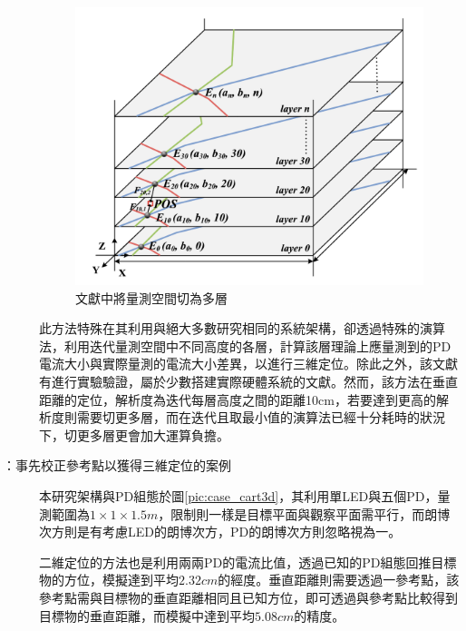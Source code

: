 \begin{description}
        \begin{figure}[htpb]
            \centering
            \includegraphics[width=12cm]{ch2pic/layers_3d.png}
            \caption{文獻\cite{case:3d_layers}中將量測空間切為多層}
            \label{pic:layers_3d}
        \end{figure}

        \qquad
        此方法特殊在其利用與絕大多數研究相同的系統架構，卻透過特殊的演算法，利用迭代量測空間中不同高度的各層，計算該層理論上應量測到的PD電流大小與實際量測的電流大小差異，以進行三維定位。除此之外，該文獻有進行實驗驗證，屬於少數搭建實際硬體系統的文獻。然而，該方法在垂直距離的定位，解析度為迭代每層高度之間的距離10cm，若要達到更高的解析度則需要切更多層，而在迭代且取最小值的演算法已經十分耗時的狀況下，切更多層更會加大運算負擔。



        \item[\cite{case:cart3d}：事先校正參考點以獲得三維定位的案例] \hfill 
        
        \qquad
        本研究架構與PD組態於圖\ref{pic:case_cart3d}，其利用單LED與五個PD，量測範圍為$1\times 1\times 1.5m$，限制則一樣是目標平面與觀察平面需平行，而朗博次方則是有考慮LED的朗博次方，PD的朗博次方則忽略視為一。
        
        二維定位的方法也是利用兩兩PD的電流比值，透過已知的PD組態回推目標物的方位，模擬達到平均$2.32cm$的經度。垂直距離則需要透過一參考點，該參考點需與目標物的垂直距離相同且已知方位，即可透過與參考點比較得到目標物的垂直距離，而模擬中達到平均$5.08cm$的精度。


\end{description}

